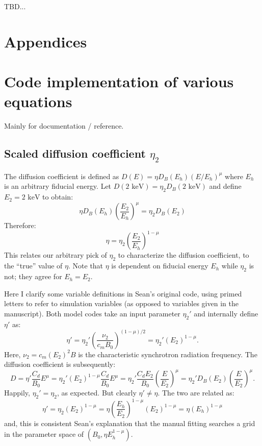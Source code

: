 \documentclass[10pt]{article}
\begin{document}
TBD...

\appendix
\section*{Appendices}
\section{Code implementation of various equations}

Mainly for documentation / reference.

\subsection{Scaled diffusion coefficient \texorpdfstring{$\eta_2$}{eta2}}

The diffusion coefficient is defined as $D(E) = \eta D_B(E_h) (E/E_h)^\mu$
where $E_h$ is an arbitrary fiducial energy.
Let $D(\text{2 keV}) = \eta_2 D_B(\text{2 keV})$ and
define $E_2 = \text{2 keV}$ to obtain:
\[
  \eta D_B(E_h) \left(\frac{E_2}{E_h}\right)^\mu = \eta_2 D_B(E_2)
\]
Therefore:
\[
    \eta = \eta_2 \left(\frac{E_2}{E_h}\right)^{1 - \mu}
\]
This relates our arbitrary pick of $\eta_2$ to characterize the diffusion
coefficient, to the ``true'' value of $\eta$.  Note that $\eta$ is dependent on
fiducial energy $E_h$ while $\eta_2$ is not; they agree for $E_h = E_2$.

Here I clarify some variable definitions in Sean's original code, using
primed letters to refer to simulation variables (as opposed to variables given
in the manuscript).  Both model codes take an input parameter $\eta_2'$ and
internally define $\eta'$ as:
\[
  \eta' = \eta_2' \left( \frac{\nu_2}{c_m B_0} \right)^{(1-\mu)/2}
        = \eta_2' (E_2)^{1-\mu}\text{.}
\]
Here, $\nu_2 = c_m (E_2)^2 B$ is the characteristic synchrotron radiation
frequency.  The diffusion coefficient is subsequently:
\[
  D = \eta' \frac{C_d}{B_0} E^\mu
    = \eta_2' (E_2)^{1-\mu} \frac{C_d}{B_0} E^\mu
    = \eta_2' \frac{C_d E_2}{B_0} \left(\frac{E}{E_2}\right)^\mu
    = \eta_2' D_B\left(E_2\right) \left(\frac{E}{E_2}\right)^\mu\text{.}
\]
Happily, $\eta_2' = \eta_2$, as expected.  But clearly $\eta' \neq \eta$.
The two are related as:
\[
  \eta' = \eta_2 (E_2)^{1-\mu}
        = \eta \left(\frac{E_h}{E_2}\right)^{1 - \mu} (E_2)^{1-\mu}
        = \eta (E_h)^{1-\mu}
\]
and, this is consistent Sean's explanation that the manual fitting searches a
grid in the parameter space of $(B_0, \eta E_h^{1-\mu})$.
\end{document}
